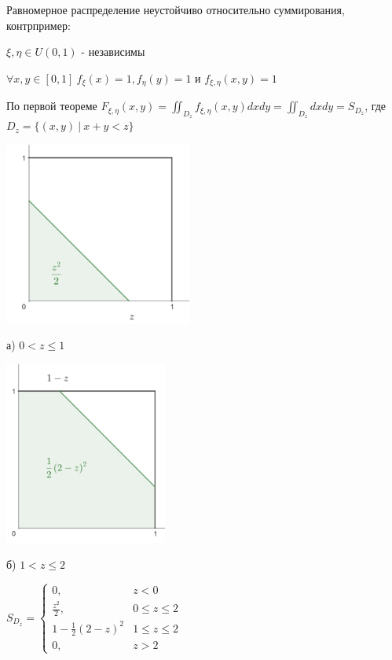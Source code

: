 \documentclass[12pt]{article}
\begin{document}
     Равномерное распределение неустойчиво относительно суммирования, контрпример:

    $\xi, \eta \in U(0, 1)$ - независимы

    $\forall x, y \in [0, 1] \ f_{\xi}(x) = 1, f_\eta(y) = 1$ и $f_{\xi, \eta}(x, y) = 1$

    По первой теореме $F_{\xi, \eta}(x, y) = \iint_{D_z} f_{\xi, \eta}(x, y) dxdy = \iint_{D_z} dxdy = S_{D_z}$, где $D_z = \{(x, y) \ | \ x + y < z\}$

    \mediumvspace

    \begin{multicols}{2}
        \begin{center}
            \includegraphics[height=6cm]{probtheory/images/probtheory_2024_11_26_3}

            а) $0 < z \leq 1$
        \end{center}

        \begin{center}
            \includegraphics[height=6cm]{probtheory/images/probtheory_2024_11_26_4}

            б) $1 < z \leq 2$
        \end{center}
    \end{multicols}

    \smallvspace

    $S_{D_z} = \begin{cases}0, & z < 0 \\ \frac{z^2}{2}, & 0 \leq z \leq 2 \\ 1 - \frac{1}{2}(2 - z)^2 & 1 \leq z \leq 2 \\ 0, & z > 2\end{cases}$
\end{document}
